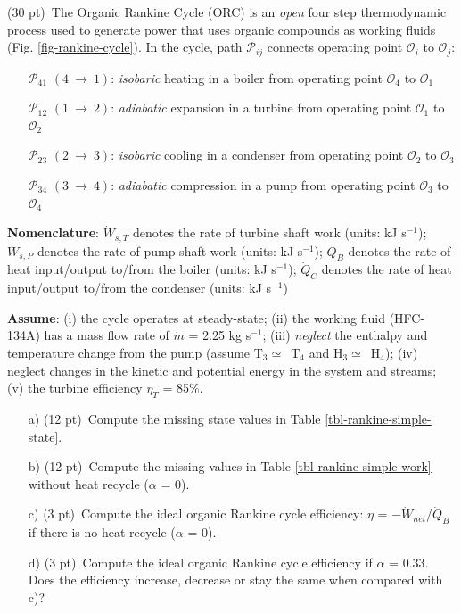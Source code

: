     \item{(30 pt)~The Organic Rankine Cycle (ORC) is an \textit{open} four step thermodynamic process used to generate power that uses organic compounds as 
    working fluids (Fig. \ref{fig-rankine-cycle}). In the cycle, path $\mathcal{P}_{ij}$ connects operating point $\mathcal{O}_{i}$ to $\mathcal{O}_{j}$:
    \begin{itemize}
      \item[$\mathcal{P}_{41}$]{$\left(4~\rightarrow~1\right)$: \textit{isobaric} heating in a boiler from operating point $\mathcal{O}_{4}$ to $\mathcal{O}_{1}$}
      \item[$\mathcal{P}_{12}$]{$\left(1~\rightarrow~2\right)$: \textit{adiabatic} expansion in a turbine from operating point $\mathcal{O}_{1}$ to $\mathcal{O}_{2}$}
      \item[$\mathcal{P}_{23}$]{$\left(2~\rightarrow~3\right)$: \textit{isobaric} cooling in a condenser from operating point $\mathcal{O}_{2}$ to $\mathcal{O}_{3}$}
      \item[$\mathcal{P}_{34}$]{$\left(3~\rightarrow~4\right)$: \textit{adiabatic} compression in a pump from operating point $\mathcal{O}_{3}$ to $\mathcal{O}_{4}$}
    \end{itemize}

    \textbf{Nomenclature}: $\dot{W}_{s,T}$ denotes the rate of turbine shaft work (units: kJ s$^{-1}$); 
    $\dot{W}_{s,P}$ denotes the rate of pump shaft work (units: kJ s$^{-1}$); 
    $\dot{Q}_{B}$ denotes the rate of heat input/output to/from the boiler (units: kJ s$^{-1}$);
    $\dot{Q}_{C}$ denotes the rate of heat input/output to/from the condenser (units: kJ s$^{-1}$)
    
    \textbf{Assume}: (i) the cycle operates at steady-state; (ii) the working fluid (HFC-134A) has a mass flow rate of $\dot{m}$ = 2.25 kg s$^{-1}$;
    (iii) \textit{neglect} the enthalpy and temperature change from the pump (assume T$_{3}\simeq$~T$_{4}$ and H$_{3}\simeq$~H$_{4}$);
    (iv) neglect changes in the kinetic and potential energy in the system and streams; (v) the turbine efficiency $\eta_{T}$ = 85\%.
    
    \begin{itemize}
      \item[a)]{(12 pt)~Compute the missing state values in Table \ref{tbl-rankine-simple-state}.}
      \item[b)]{(12 pt)~Compute the missing values in Table \ref{tbl-rankine-simple-work} without heat recycle ($\alpha$ = 0).}
      \item[c)]{(3 pt)~Compute the ideal organic Rankine cycle efficiency: $\eta$ = $-\dot{W}_{net}$/$\dot{Q}_{B}$ if there is no heat recycle ($\alpha$ = 0).}
      \item[d)]{(3 pt)~Compute the ideal organic Rankine cycle efficiency if $\alpha$ = 0.33. Does the efficiency increase, decrease or stay the same when compared with c)?}
    \end{itemize}
    
}
